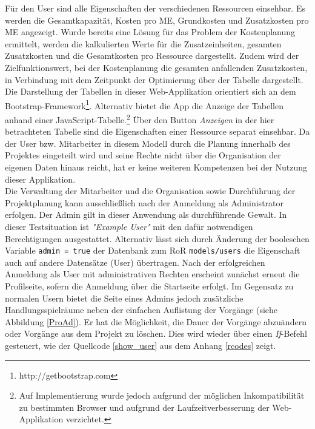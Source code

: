 \documentclass[a4paper,12pt,parskip,bibtotoc,liststotoc]{article}
\begin{document}
Für den User sind alle Eigenschaften der verschiedenen Ressourcen einsehbar. Es werden die Gesamtkapazität, Kosten pro ME, Grundkosten und Zusatzkosten pro ME angezeigt. Wurde bereits eine Lösung für das Problem der Kostenplanung ermittelt, werden die kalkulierten Werte für die Zusatzeinheiten, gesamten Zusatzkosten und die Gesamtkosten pro Ressource dargestellt. Zudem wird der Zielfunktionswert, bei der Kostenplanung die gesamten anfallenden Zusatzkosten, in Verbindung mit dem Zeitpunkt der Optimierung über der Tabelle dargestellt. Die Darstellung der Tabellen in dieser Web-Applikation orientiert sich an dem Bootstrap-Framework\footnote{http://getbootstrap.com}. Alternativ bietet die App die Anzeige der Tabellen anhand einer JavaScript-Tabelle.\footnote{Auf Implementierung wurde jedoch aufgrund der möglichen Inkompatibilität zu bestimmten Browser und aufgrund der Laufzeitverbesserung der Web-Applikation verzichtet.} Über den Button \textit{Anzeigen} in der hier betrachteten Tabelle sind die Eigenschaften einer Ressource separat einsehbar. Da der User bzw. Mitarbeiter in diesem Modell durch die Planung innerhalb des Projektes eingeteilt wird und seine Rechte nicht über die Organisation der eigenen Daten hinaus reicht, hat er keine weiteren Kompetenzen bei der Nutzung dieser Applikation. \\

Die Verwaltung der Mitarbeiter und die Organisation sowie Durchführung der Projektplanung kann ausschließlich nach der Anmeldung als Administrator erfolgen. Der Admin gilt in dieser Anwendung als durchführende Gewalt. In dieser Testsituation ist \textit{"Example User"} mit den dafür notwendigen Berechtigungen ausgestattet. Alternativ lässt sich durch Änderung der booleschen Variable \texttt{admin = true} der Datenbank zum RoR \texttt{models/users} die Eigenschaft auch auf andere Datensätze (User) übertragen. Nach der erfolgreichen Anmeldung als User mit administrativen Rechten erscheint zunächst erneut die Profilseite, sofern die Anmeldung über die Startseite erfolgt. Im Gegensatz zu normalen Usern bietet die Seite eines Admins jedoch zusätzliche Handlungsspielräume neben der einfachen Auflistung der Vorgänge (siehe Abbildung \ref{ProAd}). Er hat die Möglichkeit, die Dauer der Vorgänge abzuändern oder Vorgänge aus dem Projekt zu löschen. Dies wird wieder über einen \textit{If}-Befehl gesteuert, wie der Quellcode \ref{show_user} aus dem Anhang \ref{rcodes} zeigt.\\
\end{document}
